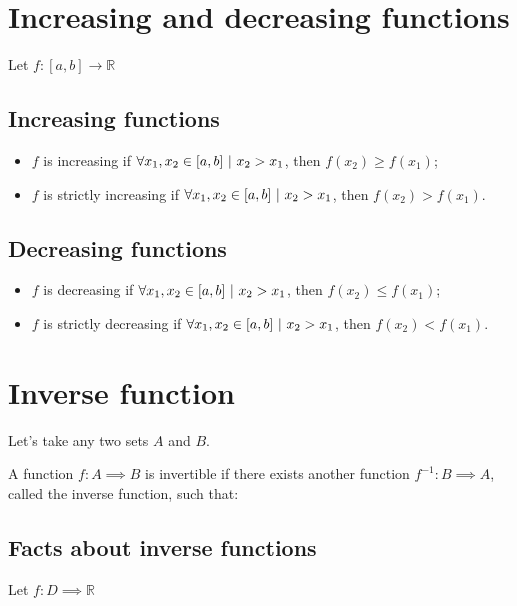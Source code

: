\documentclass{article}
\begin{document}
\newpage
\section{Increasing and decreasing functions}
Let $f:[a,b] \longrightarrow \mathbb{R}$


\subsection{Increasing functions}
\begin{itemize}
    \item $f$ is increasing if $\forall x_1,x_2 \in [a,b] \ |\  x_2>x_1$, then $f(x_2)\geq f(x_1)$;
    \item $f$ is strictly increasing if $\forall x_1,x_2 \in [a,b] \ |\  x_2>x_1$, then $f(x_2)>f(x_1)$.
\end{itemize}

\subsection{Decreasing functions}
\begin{itemize}
    \item $f$ is decreasing if $\forall x_1,x_2 \in [a,b] \ |\  x_2>x_1$, then $f(x_2)\leq f(x_1)$;
    \item $f$ is strictly decreasing if $\forall x_1,x_2 \in [a,b] \ |\  x_2>x_1$, then $f(x_2)<f(x_1)$.
\end{itemize}

\section{Inverse function}
Let's take any two sets $A$ and $B$.

A function $f: A \implies B$ is invertible if there exists another
function $f^{-1}: B \implies A$, called the inverse function, such that:



\subsection{Facts about inverse functions}
Let $f:D\implies \mathbb{R}$
\end{document}
